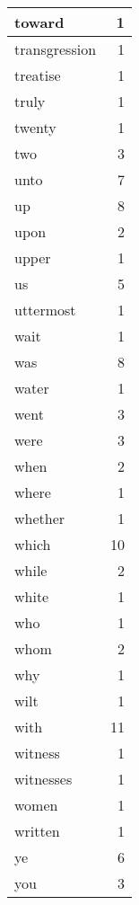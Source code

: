\begin{center}
\begin{longtable}{l|r}
toward & 1 \\ \hline
transgression & 1 \\ \hline
treatise & 1 \\ \hline
truly & 1 \\ \hline
twenty & 1 \\ \hline
two & 3 \\ \hline
unto & 7 \\ \hline
up & 8 \\ \hline
upon & 2 \\ \hline
upper & 1 \\ \hline
us & 5 \\ \hline
uttermost & 1 \\ \hline
wait & 1 \\ \hline
was & 8 \\ \hline
water & 1 \\ \hline
went & 3 \\ \hline
were & 3 \\ \hline
when & 2 \\ \hline
where & 1 \\ \hline
whether & 1 \\ \hline
which & 10 \\ \hline
while & 2 \\ \hline
white & 1 \\ \hline
who & 1 \\ \hline
whom & 2 \\ \hline
why & 1 \\ \hline
wilt & 1 \\ \hline
with & 11 \\ \hline
witness & 1 \\ \hline
witnesses & 1 \\ \hline
women & 1 \\ \hline
written & 1 \\ \hline
ye & 6 \\ \hline
you & 3 \\ \hline
\end{longtable}
\end{center}



\normalsize



